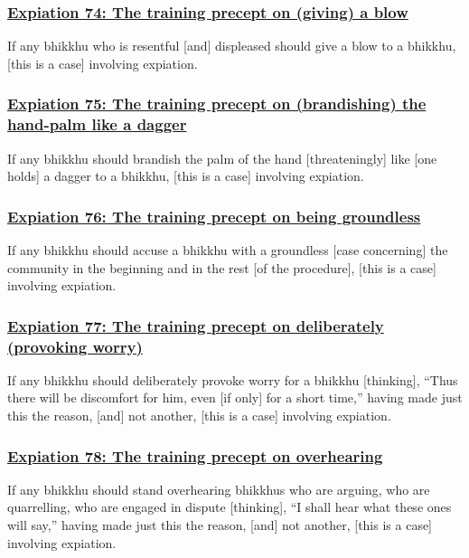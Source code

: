 \subsubsection*{\hyperref[pac74]{Expiation 74: The training precept on (giving) a blow}}
\label{exp74}
If any bhikkhu who is resentful [and] displeased should give a blow to a bhikkhu, [this is a case] involving expiation.



\subsubsection*{\hyperref[pac75]{Expiation 75: The training precept on (brandishing) the hand-palm like a dagger}}
\label{exp75}
If any bhikkhu should brandish the palm of the hand [threateningly] like [one holds] a dagger to a bhikkhu, [this is a case] involving expiation.



\subsubsection*{\hyperref[pac76]{Expiation 76: The training precept on being groundless}}
\label{exp76}
If any bhikkhu should accuse a bhikkhu with a groundless [case concerning] the community in the beginning and in the rest [of the procedure], [this is a case] involving expiation.



\subsubsection*{\hyperref[pac77]{Expiation 77: The training precept on deliberately (provoking worry)}}
\label{exp77}
If any bhikkhu should deliberately provoke worry for a bhikkhu [thinking], ``Thus there will be discomfort for him, even [if only] for a short time,'' having made just this the reason, [and] not another, [this is a case] involving expiation.



\subsubsection*{\hyperref[pac78]{Expiation 78: The training precept on overhearing}}
\label{exp78}
If any bhikkhu should stand overhearing bhikkhus who are arguing, who are quarrelling, who are engaged in dispute [thinking], ``I shall hear what these ones will say,'' having made just this the reason, [and] not another, [this is a case] involving expiation.



